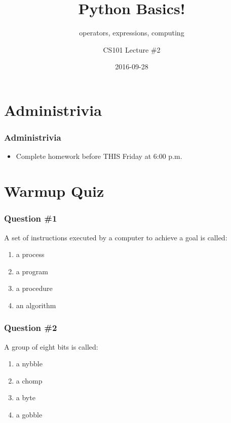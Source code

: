 \documentclass[11pt]{beamer}
\title{Python Basics!}
\subtitle{operators, expressions, computing}
\author{CS101 Lecture \#2}
\date{2016-09-28}
\begin{document}
  \setcounter{showProgressBar}{0}
  \setcounter{showSlideNumbers}{0}

\frame{\titlepage}

\setcounter{framenumber}{0}
\setcounter{showProgressBar}{1}
\setcounter{showSlideNumbers}{1}

\section{Administrivia}

\begin{frame}
  \frametitle{Administrivia}
  \Enlarge
  \begin{itemize}
  \item Complete homework before THIS Friday at 6:00 p.m.
  \end{itemize}
\end{frame}

\section{Warmup Quiz}

\begin{frame}
  \frametitle{Question \#1}
  \Enlarge

  A set of instructions executed by a computer to achieve a goal is called:
  \begin{enumerate}[label=\Alph*]
  \item  a process
  \item  a program
  \item  a procedure
  \item  an algorithm
  \end{enumerate}
\end{frame}

\begin{frame}
  \frametitle{Question \#2}
  \Enlarge

  A group of eight bits is called:
  \begin{enumerate}[label=\Alph*]
  \item  a nybble
  \item  a chomp
  \item  a byte
  \item  a gobble
  \end{enumerate}
\end{frame}
\end{document}
